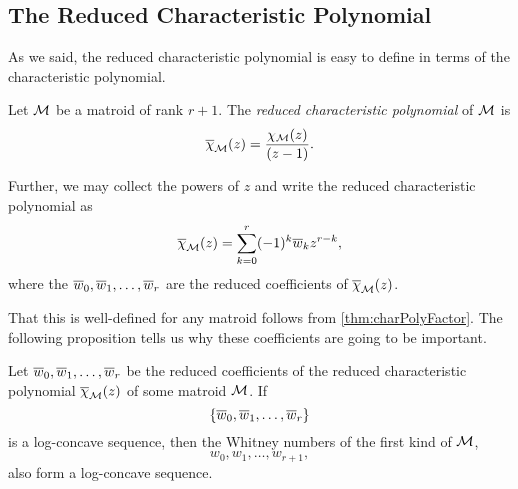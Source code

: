 \documentclass[12pt,oneside]{../../sfsuthesis}
\begin{document}
\subsection{The Reduced Characteristic Polynomial}
As we said, the reduced characteristic polynomial is easy to define in terms of the characteristic polynomial.
\begin{definition}\label{def:reducedCharPoly}
    Let \( \mathcal{M} \) be a matroid of rank \( r + 1 \).
    The \emph{reduced characteristic polynomial} of \( \mathcal{M} \) is
    \[
        \overline{\chi}_{\mathcal{M}}(z) = \frac{\chi_{\mathcal{M}}(z)}{(z-1)}.
    \]

    Further, we may collect the powers of \( z \) and write the reduced characteristic polynomial as
    \[
        \overline{\chi}_{\mathcal{M}}(z) = \sum_{k=0}^r (-1)^k\overline{w}_k z^{r-k},
    \]
    where the \( \overline{w}_0, \overline{w}_1, \dots, \overline{w}_r \) are the reduced coefficients of \( \overline{\chi}_{\mathcal{M}}(z) \).
\end{definition}
That this is well-defined for any matroid follows from \th\ref{thm:charPolyFactor}.
The following proposition tells us why these coefficients are going to be important.
\begin{lemma}\th\label{thm:reducedImpliesOriginal}
    Let  \( \overline{w}_0, \overline{w}_1, \dots, \overline{w}_r \) be the reduced coefficients of the reduced characteristic polynomial \( \overline{\chi}_{\mathcal{M}}(z) \) of some matroid \( \mathcal{M} \).
    If
    \[
        \{\overline{w}_0, \overline{w}_1, \dots, \overline{w}_r \}
    \]
    is a log-concave sequence, then the Whitney numbers of the first kind of \( \mathcal{M} \),
    \[
        w_0, w_1, \dots, w_{r+1},
    \]
    also form a log-concave sequence.
\end{lemma}
\end{document}
